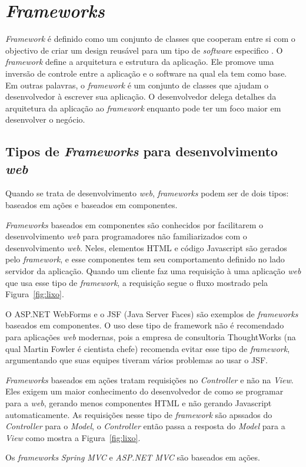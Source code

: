 \section{\textit{Frameworks}}

\textit{Framework} é definido como um conjunto de classes que cooperam entre si com o objectivo de criar um design reusável para um tipo de \textit{software} especifico \cite{28}.
O \textit{framework} define a arquitetura e estrutura da aplicação. Ele promove uma inversão de controle entre a aplicação e o software na qual ela tem como base. 
Em outras palavras, o \textit{framework} é um conjunto de classes que ajudam o desenvolvedor à escrever sua aplicação. 
O desenvolvedor delega detalhes da arquitetura da aplicação ao \textit{framework} enquanto pode ter um foco maior em desenvolver o negócio.

\subsection{Tipos de \textit{Frameworks} para desenvolvimento \textit{web}}

Quando se trata de desenvolvimento \textit{web}, \textit{frameworks} podem ser de dois tipos: baseados em ações e baseados em componentes.

\textit{Frameworks} baseados em componentes são conhecidos por facilitarem o desenvolvimento \textit{web} para programadores não familiarizados com o desenvolvimento \textit{web}. 
Neles, elementos HTML e código Javascript são gerados pelo \textit{framework}, e esse componentes tem seu comportamento definido no lado servidor da aplicação.
Quando um cliente faz uma requisição à uma aplicação \textit{web} que usa esse tipo de \textit{framework}, a requisição segue o fluxo mostrado pela Figura~\ref{fig:lixo}.


O ASP.NET WebForms e o JSF (Java Server Faces) são exemplos de \textit{frameworks} baseados em componentes. O uso dese tipo de framework não é recomendado para aplicações \textit{web} modernas, 
pois a empresa de consultoria ThoughtWorks (na qual Martin Fowler é cientista chefe) recomenda evitar esse tipo de \textit{framework}, 
argumentando que suas equipes tiveram vários problemas ao usar o JSF.

\textit{Frameworks} baseados em ações tratam requisições no \textit{Controller} e não na \textit{View}. 
Eles exigem um maior conhecimento do desenvolvedor de como se programar para a \textit{web}, gerando menos componentes HTML e não gerando Javascript automaticamente. 
As requisições nesse tipo de \textit{framework} são apssados do \textit{Controller} para o \textit{Model}, o \textit{Controller} então passa a resposta do \textit{Model} para a \textit{View} como mostra a Figura~\ref{fig:lixo}.


Os \textit{frameworks} \textit{Spring MVC} e \textit{ASP.NET MVC} são baseados em ações.
